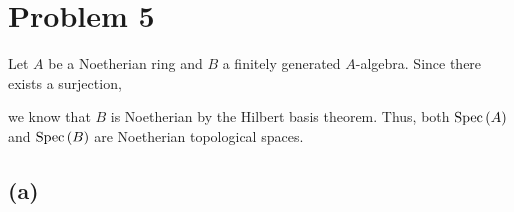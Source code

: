 \documentclass[12pt]{extarticle}
\begin{document}
\section*{Problem 5}

Let $A$ be a Noetherian ring and $B$ a finitely generated $A$-algebra. Since there exists a surjection,
\begin{center}
\end{center}
we know that $B$ is Noetherian by the Hilbert basis theorem. Thus, both $\mathrm{Spec}\left( A \right)$ and $\mathrm{Spec}\left( B \right)$ are Noetherian topological spaces.

\subsection*{(a)}
\end{document}
